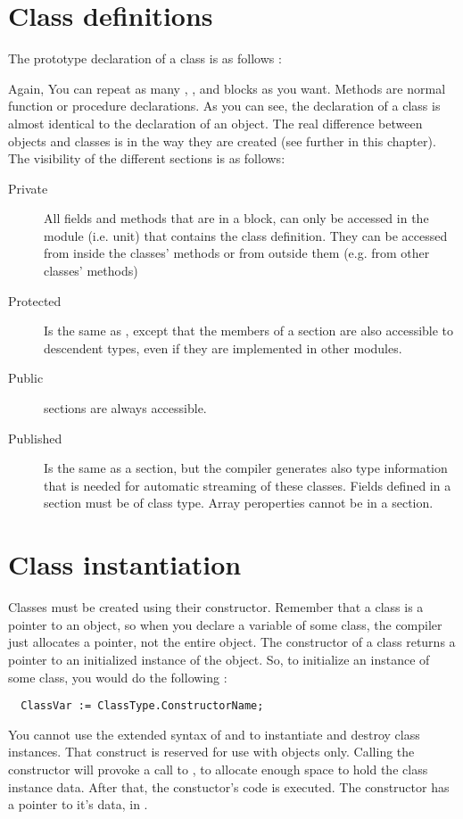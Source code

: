 \documentclass{report}
\begin{document}
\section{Class definitions}
The prototype declaration of a class is as follows :

Again, You can repeat as many , , 
and  blocks as you want.
Methods are normal function or procedure declarations.
As you can see, the declaration of a class is almost identical to the
declaration of an object. The real difference between objects and classes
is in the way they are created (see further in this chapter).
The visibility of the different sections is as follows:
\begin{description}
\item [Private\ ] All fields and methods that are in a  block, can
only be accessed in the module (i.e. unit) that contains the class definition.
They can be accessed from inside the classes' methods or from outside them
(e.g. from other classes' methods)
\item [Protected\ ] Is the same as , except that the members of
a  section are also accessible to descendent types, even if
they are implemented in other modules.
\item [Public\ ] sections are always accessible.
\item [Published\ ] Is the same as a  section, but the compiler
generates also type information that is needed for automatic streaming of
these classes. Fields defined in a  section must be of class type.
Array peroperties cannot be in a  section.
\end{description}


\section{Class instantiation}
Classes must be created using their constructor. Remember that a class is a
pointer to an object, so when you declare a variable of some class, the
compiler just allocates a pointer, not the entire object. The constructor of
a class returns a pointer to an initialized instance of the object.
So, to initialize an instance of some class, you would do the following :
\begin{verbatim}
  ClassVar := ClassType.ConstructorName;
\end{verbatim}
You cannot use the extended syntax of  and  to
instantiate and destroy class instances.
That construct is reserved for use with objects only.
Calling the constructor will provoke a call to , to allocate
enough space to hold the class instance data.
After that, the constuctor's code is executed.
The constructor has a pointer to it's data, in .
\end{document}
